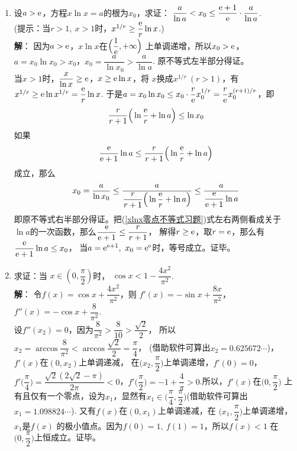 \begin{enumerate}[label={\textbf{\arabic*.}},leftmargin=
    \inteval{\myenumleftmargin}pt]
\item 设$ a>\mathrm{e} $，方程$ x\ln x=a $的根为$ x_0 $，求证：
$ \dfrac{a}{\ln a}<x_0\leq \dfrac{\mathrm{e}+1}{\mathrm{e}}\cdot \dfrac{a}{\ln a} $. \\
(提示：当$ r>1,\ x>1 $时，$ x^{1/r}\geq \dfrac{\mathrm{e}}{r}\ln x $.)
\ifteach \\ \textbf{解}：
因为$ a>\mathrm{e} $，$ x\ln x $在$ \Big(\dfrac{1}{\mathrm{e}},+\infty\Big) $
上单调递增，所以$ x_0>\mathrm{e} $，$ a=x_0\ln x_0>x_0 $，$ x_0=\dfrac{a}{\ln x_0}
>\dfrac{a}{\ln a} $. 原不等式左半部分得证。\\
当$ x>1 $时，$ \dfrac{x}{\ln x}\geq \mathrm{e} $，$ x\geq \mathrm{e}\ln x $，将
$ x $换成$ x^{1/r}\ (r>1) $，有$ x^{1/r}\geq \mathrm{e}\ln x^{1/r}=\dfrac{\mathrm{e}}{r}\ln x $.
于是$ a=x_0\ln x_0\leq x_0\cdot \dfrac{r}{\mathrm{e}}x_0^{1/r}=\dfrac{r}{\mathrm{e}}
x_0^{(r+1)/r} $，即
\begin{gather*}
    \dfrac{r}{r+1}\Big(\ln\dfrac{\mathrm{e}}{r}+\ln a\Big)\leq \ln x_0
\end{gather*}
如果
\begin{gather}\label{xlnx零点不等式习题}
    \dfrac{\mathrm{e}}{\mathrm{e}+1}\ln a\leq \dfrac{r}{r+1}\Big(\ln\dfrac{\mathrm{e}}{r}+\ln a\Big)
\end{gather}
成立，那么
\begin{gather*}
    x_0=\dfrac{a}{\ln x_0}\leq \dfrac{a}{\dfrac{r}{r+1}\Big(
        \ln\dfrac{\mathrm{e}}{r}+\ln a\Big)} 
    \leq \dfrac{a}{\dfrac{\mathrm{e}}{\mathrm{e}+1}\ln a}
\end{gather*}
即原不等式右半部分得证。把(\ref{xlnx零点不等式习题})式左右两侧看成关于
$ \ln a $的一次函数，那么$ \dfrac{\mathrm{e}}{\mathrm{e}+1}\leq \dfrac{r}{r+1} $，
解得$ r\geq \mathrm{e} $，取$ r=\mathrm{e} $，那么有$ \dfrac{\mathrm{e}}{\mathrm{e}+1}\ln a\leq x_0 $，
当$ a=\e^{\e+1},\ x_0=\e^{\e} $时，等号成立。证毕。
\fi

\item 求证：当 $ x\in \left(0,\dfrac{\pi}{2}\right) $时，
$ \cos x<1-\dfrac{4x^2}{\pi^2} $.
\ifteach \\ \textbf{解}：
令$ f(x)=\cos x+\dfrac{4x^2}{\pi^2} $，则
$ f'(x) =-\sin x+\dfrac{8x}{\pi^2} $，
$ f''(x)=-\cos x+\dfrac{8}{\pi^2} $.\\
设$ f''(x_2)=0 $，因为$ \dfrac{8}{\pi^2}>\dfrac{8}{10}>\dfrac{\sqrt{2}}{2} $，
所以$ x_2=\arccos\dfrac{8}{\pi^2}<\arccos\dfrac{\sqrt{2}}{2}=\dfrac{\pi}{4} $，
(借助软件可算出$ x_2=0.625672\cdots $)，$ f'(x) $在$ (0,x_2) $上单调递减，
在$ \Big(x_2,\dfrac{\pi}{2}\Big) $上单调递增，$ f'(0)=0 $，
$ f'\Big(\dfrac{\pi}{4}\Big)
=\dfrac{\sqrt{2}(2\sqrt{2}-\pi)}{2\pi}<0 $，$ f'\Big(\dfrac{\pi}{2}\Big)
=-1+\dfrac{4}{\pi}>0 $.所以，$ f'(x) $在$ \big(0,\dfrac{\pi}{2}\big) $
上有且仅有一个零点，设为$ x_1 $，显然有$ x_1\in\Big(\dfrac{\pi}{4},
\dfrac{\pi}{2}\Big) $(借助软件可算出$ x_1=1.098824\cdots $).
又有$ f(x) $在$ (0,x_1) $上单调递减，在
$ \Big(x_1,\dfrac{\pi}{2}\Big) $上单调递增，$ x_1 $是$ f(x) $
的极小值点。因为$ f(0)=1,\ f(1)=1 $，所以$ f(x)<1 $
在$ \Big(0,\dfrac{\pi}{2}\Big) $上恒成立。证毕。
\fi


\end{enumerate}
